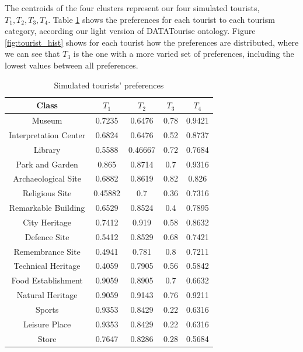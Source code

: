 The centroids of the four clusters represent our four simulated tourists, $T_1, T_2, T_3, T_4$. Table \ref{table:centroids} shows the preferences for each tourist to each tourism category, according our light version of DATATourise ontology.  Figure \ref{fig:tourist_hist} shows for each tourist how the preferences are distributed, where we can see that $T_3$ is the one with a more varied set of preferences, including the lowest values between all preferences.

\begin{table}[h!]
\centering
\caption{Simulated tourists' preferences}
\label{table:centroids}
\begin{tabular}{ |c|c|c|c|c| } 
    \hline
    Class & $T_1$ & $T_2$ & $T_3$ & $T_4$ \\
    \hline
    \hline

    Museum & 0.7235 & 0.6476 & 0.78 & 0.9421 \\ 
    \hline
    Interpretation Center & 0.6824 & 0.6476 & 0.52 & 0.8737 \\
    \hline
    Library & 0.5588 & 0.46667 & 0.72 & 0.7684 \\
    \hline
    Park and Garden & 0.865 & 0.8714 & 0.7 & 0.9316 \\
    \hline
    Archaeological Site & 0.6882 & 0.8619 & 0.82 & 0.826 \\
    \hline
    Religious Site & 0.45882 & 0.7 & 0.36 & 0.7316 \\
    \hline
    Remarkable Building & 0.6529 & 0.8524 & 0.4 & 0.7895 \\
    \hline
    City Heritage & 0.7412 & 0.919 & 0.58 & 0.8632 \\
    \hline
    Defence Site & 0.5412 & 0.8529 & 0.68 & 0.7421 \\
    \hline
    Remembrance Site & 0.4941 & 0.781 & 0.8 & 0.7211 \\
    \hline
    Technical Heritage & 0.4059 & 0.7905 & 0.56 & 0.5842 \\
    \hline
    Food Establishment & 0.9059 & 0.8905 & 0.7 & 0.6632 \\
    \hline
    Natural Heritage & 0.9059 & 0.9143 & 0.76 & 0.9211 \\
    \hline
    Sports & 0.9353 & 0.8429 & 0.22 & 0.6316 \\
    \hline
    Leisure Place & 0.9353 & 0.8429 & 0.22 & 0.6316 \\
    \hline
    Store & 0.7647 & 0.8286 & 0.28 & 0.5684 \\
    
    \hline
\end{tabular}
\end{table}

